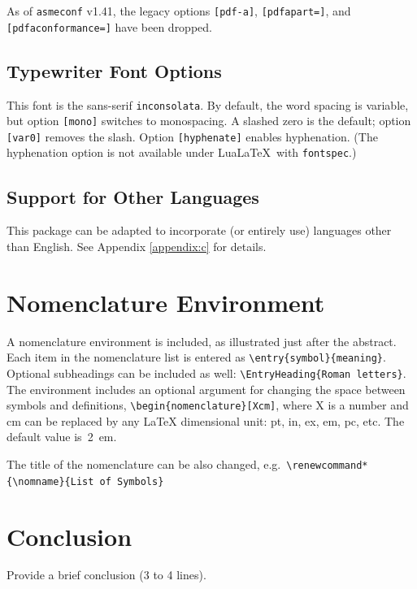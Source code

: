 \documentclass[colorlinks,upint,subscriptcorrection,varvw,hyphenate,balance,greek,russian,vietnamese,german]{asmeconf} %
\newcommand*\LuaLaTeX{Lua\LaTeX}
\begin{document}
As of \texttt{asmeconf} v1.41, the legacy options \texttt{[pdf-a]}, \texttt{[pdfapart=]}, and \texttt{[pdfaconformance=]} have been dropped.

\subsection{Typewriter Font Options} This font is the sans-serif \texttt{inconsolata}. By default, the word spacing is variable, but option \texttt{[mono]} switches to monospacing. A slashed zero is the default; option \texttt{[var0]} removes the slash. Option \texttt{[hyphenate]} enables hyphenation. (The hyphenation option is not available under \LuaLaTeX\  with \texttt{fontspec}.)

\subsection{Support for Other Languages}  This package can be adapted to incorporate (or entirely use) languages other than English. See Appendix \ref{appendix:c} for details.



\section{Nomenclature Environment}
A nomenclature environment is included, as illustrated just after the abstract.  Each item in the nomenclature list is entered as \verb|\entry{symbol}{meaning}|.  Optional subheadings can be included as well: \verb|\EntryHeading{Roman letters}|.  The environment includes an optional argument for changing the space between symbols and definitions, 
\verb|\begin{nomenclature}[Xcm]|, where X is a number and cm can be replaced by any LaTeX dimensional unit: pt, in, ex, em, pc, etc. The default value is~2~em.

The title of the nomenclature can be also changed, e.g.\ \verb|\renewcommand*{\nomname}{List of Symbols}|




\section{Conclusion}
Provide a brief conclusion (3 to 4 lines).
\end{document}
